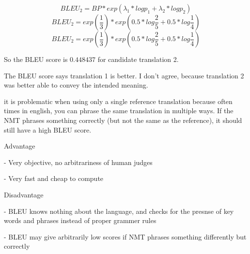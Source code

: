 \documentclass[11pt,largemargins]{homework}
\begin{document}
$$BLEU_2 = BP * exp(\lambda_1 * log p_1 + \lambda_2 * log p_2) $$  
$$BLEU_2 = exp(\frac{1}{3}) * exp(0.5 * log \frac{2}{5} + 0.5 * log \frac{1}{4}) $$  
$$BLEU_2 = exp(\frac{1}{3}) * exp(0.5 * log \frac{2}{5} + 0.5 * log \frac{1}{4}) $$  

So the BLEU score is $0.448437$ for candidate translation 2.


The BLEU score says translation 1 is better. I don't agree, because translation 2 was better able to convey the intended meaning.

\question it is problematic when using only a single reference translation because often times in english, you can phrase the same translation in multiple ways. If the NMT phrases something correctly (but not the same as the reference), it should still have a high BLEU score. 

\question

Advantage 

- Very objective, no arbitrariness of human judges

- Very fast and cheap to compute

Disadvantage

- BLEU knows nothing about the language, and checks for the presnse of key words and phrases instead of proper grammer rules

- BLEU may give arbitrarily low scores if NMT phrases something differently but correctly 
\end{document}
